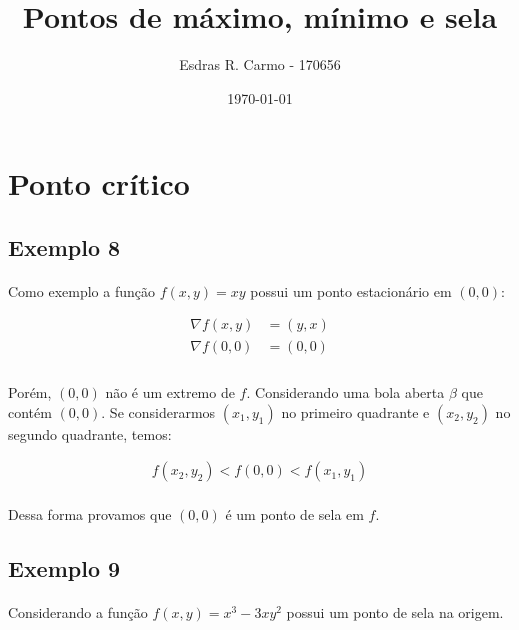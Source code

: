 \documentclass{article}
\author{Esdras R. Carmo - 170656}
\title{Pontos de máximo, mínimo e sela}
\date{\today}
\begin{document}
    \maketitle
    
    \section{Ponto crítico}
        \subsection{Exemplo 8}
            \paragraph{}
            Como exemplo a função $f(x, y) = xy$ possui um ponto estacionário em $(0, 0)$:

            \begin{align*}
                \nabla f(x, y) &= (y, x)\\
                \nabla f(0,0) &= (0, 0)\\
            \end{align*}

            \paragraph{}
            Porém, $(0,0)$ não é um extremo de $f$. Considerando uma bola aberta $\beta$ que contém
            $(0,0)$. Se considerarmos $(x_1, y_1)$ no primeiro quadrante e $(x_2, y_2)$ no segundo quadrante, temos:

            \begin{align*}
                f(x_2, y_2) < f(0,0) < f(x_1, y_1)
            \end{align*}

            \paragraph{}
            Dessa forma provamos que $(0,0)$ é um ponto de sela em $f$.

        \subsection{Exemplo 9}
            \paragraph{}
            Considerando a função $f(x, y) = x^3 - 3xy^2$ possui um ponto de sela na origem.
\end{document}
